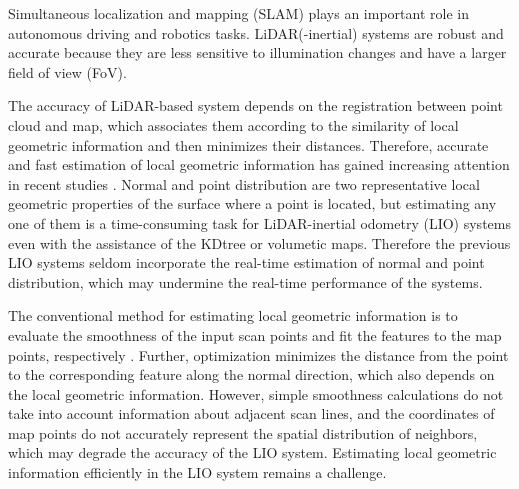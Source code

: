 \documentclass[letterpaper, 10 pt, conference]{ieeeconf}  %
\begin{document}
Simultaneous localization and mapping (SLAM) plays an important role in autonomous driving and robotics tasks.
LiDAR(-inertial) systems \cite{shan2020lio, ye2019tightly, qin2020lins, reinke2022locus2} are robust and accurate because they are less sensitive to illumination changes and have a larger field of view (FoV).

The accuracy of LiDAR-based system depends on the registration between point cloud and map, which associates them according to the similarity of local geometric information and then minimizes their distances.
Therefore, accurate and fast estimation of local geometric information has gained increasing attention in recent studies \cite{chen2022direct, nguyen2023slict, reinke2022locus2, palieri2020locus, ramezani2022wildcat}.
Normal and point distribution are two representative local geometric properties of the surface where a point is located, but estimating any one of them is a time-consuming task for LiDAR-inertial odometry (LIO) systems even with the assistance of the KDtree or volumetic maps.
Therefore the previous LIO systems seldom incorporate the real-time estimation of normal and point distribution, which may undermine the real-time performance of the systems.

The conventional method for estimating local geometric information is to evaluate the smoothness of the input scan points and fit the features to the map points, respectively \cite{zhang2014loam}.
Further, optimization minimizes the distance from the point to the corresponding feature along the normal direction, which also depends on the local geometric information.
However, simple smoothness calculations do not take into account information about adjacent scan lines, and the coordinates of map points do not accurately represent the spatial distribution of neighbors, which may degrade the accuracy of the LIO system.
Estimating local geometric information efficiently in the LIO system remains a challenge.
\end{document}
